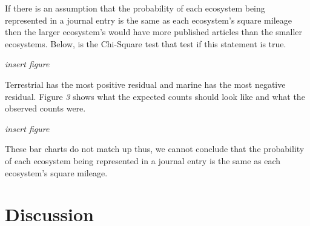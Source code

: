 \documentclass[
]{article}
\begin{document}
If there is an assumption that the probability of each ecosystem being
represented in a journal entry is the same as each ecosystem's square
mileage then the larger ecosystem's would have more published articles
than the smaller ecosystems. Below, is the Chi-Square test that test if
this statement is true.

\emph{insert figure}

Terrestrial has the most positive residual and marine has the most
negative residual. Figure \emph{3} shows what the expected counts should
look like and what the observed counts were.

\emph{insert figure}

These bar charts do not match up thus, we cannot conclude that the
probability of each ecosystem being represented in a journal entry is
the same as each ecosystem's square mileage.

\hypertarget{discussion}{%
\section{Discussion}\label{discussion}}
\end{document}
